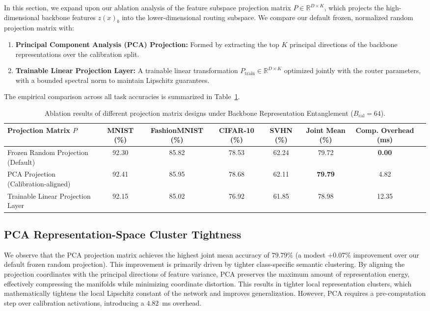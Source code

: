 \documentclass{article}
\theoremstyle{plain}
\theoremstyle{definition}
\theoremstyle{remark}
\begin{document}
In this section, we expand upon our ablation analysis of the feature subspace projection matrix $P \in \mathbb{R}^{D \times K}$, which projects the high-dimensional backbone features $z(x)_b$ into the lower-dimensional routing subspace. We compare our default frozen, normalized random projection matrix with:
\begin{enumerate}
    \item \textbf{Principal Component Analysis (PCA) Projection:} Formed by extracting the top $K$ principal directions of the backbone representations over the calibration split.
    \item \textbf{Trainable Linear Projection Layer:} A trainable linear transformation $P_{\text{train}} \in \mathbb{R}^{D \times K}$ optimized jointly with the router parameters, with a bounded spectral norm to maintain Lipschitz guarantees.
\end{enumerate}
The empirical comparison across all task accuracies is summarized in Table~\ref{tab:projection_ablations}.

\begin{table}[h]
\caption{Ablation results of different projection matrix designs under Backbone Representation Entanglement ($B_{\text{cal}}=64$).}
\label{tab:projection_ablations}
\vskip 0.1in
\begin{center}
\begin{small}
\begin{tabular}{lccccccr}
\toprule
Projection Matrix $P$ & MNIST (\%) & FashionMNIST (\%) & CIFAR-10 (\%) & SVHN (\%) & Joint Mean (\%) & Comp. Overhead (ms) \\
\midrule
Frozen Random Projection (Default)  & 92.30 & 85.82 & 78.53 & 62.24 & 79.72 & \textbf{0.00} \\
PCA Projection (Calibration-aligned)& 92.41 & 85.95 & 78.68 & 62.11 & \textbf{79.79} & 4.82 \\
Trainable Linear Projection Layer   & 92.15 & 85.02 & 76.92 & 61.85 & 78.98 & 12.35 \\
\bottomrule
\end{tabular}
\end{small}
\end{center}
\end{table}

\subsection{PCA Representation-Space Cluster Tightness}
We observe that the PCA projection matrix achieves the highest joint mean accuracy of $79.79\%$ (a modest $+0.07\%$ improvement over our default frozen random projection). This improvement is primarily driven by tighter class-specific semantic clustering. By aligning the projection coordinates with the principal directions of feature variance, PCA preserves the maximum amount of representation energy, effectively compressing the manifolds while minimizing coordinate distortion. This results in tighter local representation clusters, which mathematically tightens the local Lipschitz constant of the network and improves generalization. However, PCA requires a pre-computation step over calibration activations, introducing a $4.82$~ms overhead.
\end{document}
